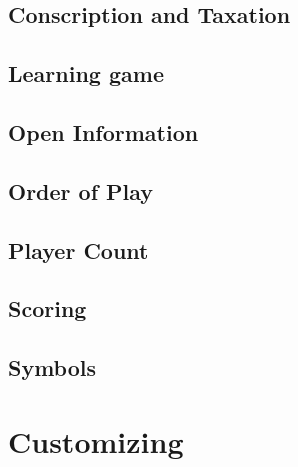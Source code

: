 \documentclass[12pt,a4paper,twocolumn,titlepage]{article}
\begin{document}
\subsection{Conscription and Taxation}
\label{sec:anytime}


\subsection{Learning game}
\label{sec:learning}


\subsection{Open Information}
\label{sec:information}


\subsection{Order of Play}
\label{sec:order}


\subsection{Player Count}
\label{sec:playercount}


\subsection{Scoring}
\label{sec:scoring}


\subsection{Symbols}
\label{sec:symbols}

% 

\section{Customizing}
\label{sec:customizing}

\end{document}
